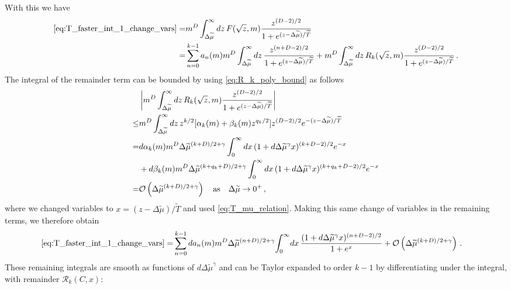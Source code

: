 \documentclass[sn-mathphys,Numbered]{sn-jnl}
\begin{document}
With this we have
\begin{align}
\eqref{eq:T_faster_int_1_change_vars} =&m^{D}\int_{\Delta\widetilde{\mu}}^\infty dz\, F(\sqrt{z},m)    \frac{z^{(D-2)/2}}{1+e^{(z-\Delta\widetilde{\mu})/\widetilde{T}}} \\
=& \sum_{n=0}^{k-1} a_n(m)m^{D}\int_{\Delta\widetilde{\mu}}^\infty dz\, \frac{z^{(n+D-2)/2}}{1+e^{(z-\Delta\widetilde{\mu})/\widetilde{T}}}+m^{D}\int_{\Delta\widetilde{\mu}}^\infty dz\,R_k(\sqrt{z},m)\frac{z^{(D-2)/2}}{1+e^{(z-\Delta\widetilde{\mu})/\widetilde{T}}}\,.\notag
\end{align}
The integral of the remainder term can be bounded by using \eqref{eq:R_k_poly_bound} as follows
\begin{align}
   &\left|m^{D}\int_{\Delta\widetilde{\mu}}^\infty dz\,R_k(\sqrt{z},m)\frac{z^{(D-2)/2}}{1+e^{(z-\Delta\widetilde{\mu})/\widetilde{T}}}\right|\\
   \leq&m^{D}\int_{\Delta\widetilde{\mu}}^\infty dz\,z^{k/2}[\alpha_k(m)+\beta_k(m)z^{q_k/2}]z^{(D-2)/2}e^{-(z-\Delta\widetilde{\mu})/\widetilde{T}}\notag\\
=&d\alpha_k(m)m^{D}\Delta\widetilde{\mu}^{(k+D)/2+\gamma}\int_{0}^\infty dx\,(1+d\Delta\widetilde{\mu}^{\gamma}x)^{(k+D-2)/2}e^{-x}\notag\\
&+d\beta_k(m)m^{D}\Delta\widetilde{\mu}^{(k+q_k+D)/2+\gamma}\int_{0}^\infty dx\,(1+d\Delta\widetilde{\mu}^{\gamma}x)^{(k+q_k+D-2)/2}e^{-x}\notag\\   
=&\mathcal{O}\left(\Delta\widetilde{\mu}^{(k+D)/2+\gamma}\right)\quad \text{as}\quad\Delta\widetilde{\mu}\to 0^+\,,\label{eq:T_faster_remainder_bound}
\end{align}
where we changed variables to $x=(z-\Delta\widetilde{\mu})/\widetilde{T}$ and used \eqref{eq:T_mu_relation}.  Making this same change of variables in the remaining terms, we  therefore obtain
\begin{align}\label{eq:T_faster_int_1_change_vars_expanded1}
\eqref{eq:T_faster_int_1_change_vars} =& \sum_{n=0}^{k-1} da_n(m)m^{D}\Delta\widetilde{\mu}^{(n+D)/2+\gamma}\!\int_{0}^\infty\! dx\, \frac{(1+d\Delta\widetilde{\mu}^{\gamma}x)^{(n+D-2)/2}}{1+e^{x}}+\mathcal{O}\left(\Delta\widetilde{\mu}^{(k+D)/2+\gamma}\right)\,.
\end{align}
These remaining integrals are smooth as functions of $d\Delta\widetilde{\mu}^\gamma$ and can be Taylor expanded   to order $k-1$ by differentiating under the integral, with remainder $\mathcal{R}_k(C,x)$:
\end{document}
